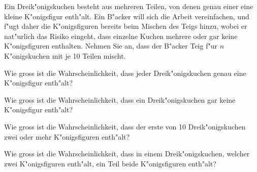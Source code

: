 Ein Dreik"onigskuchen besteht aus mehreren Teilen, von denen genau einer 
eine kleine
K"onigsfigur enth"alt. Ein B"acker will sich die Arbeit vereinfachen, und
f"ugt daher die K"onigsfiguren bereits beim Mischen des Teigs hinzu,
wobei er nat"urlich das Risiko eingeht, dass einzelne Kuchen mehrere oder
gar keine K"onigsfiguren enthalten. Nehmen Sie an, dass der B"acker Teig
f"ur $n$ K"onigskuchen mit je 10 Teilen mischt.
\begin{teilaufgaben}
\item Wie gross ist die Wahrscheinlichkeit, dass jeder Dreik"onigskuchen genau
eine K"onigsfigur enth"alt?
\item Wie gross ist die Wahrscheinlichkeit, dass ein Dreik"onigskuchen gar
keine K"onigsfigur enth"alt?
\item Wie gross ist die Wahrscheinlichkeit, dass der erste von
10 Dreik"onigskuchen zwei oder mehr K"onigsfiguren enth"alt?
\item Wie gross ist die Wahrscheinlichkeit, dass in einem Dreik"onigskuchen,
welcher zwei K"onigsfiguren enth"alt, ein Teil
beide K"onigsfiguren enth"alt?
\end{teilaufgaben}


